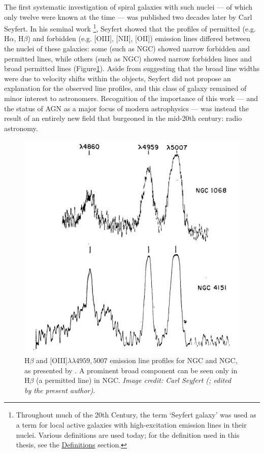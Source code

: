 The first systematic investigation of spiral galaxies with such nuclei --- of which only twelve were known at the time --- was published two decades later by Carl Seyfert. In his seminal work \citep{Seyfert1943}\footnote{Throughout much of the 20th Century, the term `Seyfert galaxy' was used as a term for local active galaxies with high-excitation emission lines in their nuclei. Various definitions are used today; for the definition used in this thesis, see the \hyperlink{chapter: definitions}{Definitions} section.}, Seyfert showed that the profiles of permitted (e.g. H$\alpha$, H$\beta$) and forbidden (e.g. [OIII], [NII], [OII]) emission lines differed between the nuclei of these galaxies: some (such as NGC) showed narrow forbidden and permitted lines, while others (such as NGC) showed narrow forbidden lines and broad permitted lines (Figure\;\ref{fig: introduction: historical_context: seyfert1943_spectra}). Aside from suggesting that the broad line widths were due to velocity shifts within the objects, Seyfert did not propose an explanation for the observed line profiles, and this class of galaxy remained of minor interest to astronomers. Recognition of the importance of this work --- and the status of AGN as a major focus of modern astrophysics --- was instead the result of an entirely new field that burgeoned in the mid-20th century: radio astronomy.

\begin{figure}
    \centering
    \includegraphics{figures/introduction/seyfert1943_spectra.png}
    \caption[Emission-line profiles for NGC and NGC as presented by \citet{Seyfert1943}.]{H$\beta$ and [OIII]$\lambda\lambda4959,5007$ emission line profiles for NGC and NGC, as presented by \citet{Seyfert1943}. A prominent broad component can be seen only in H$\beta$ (a permitted line) in NGC. \textit{Image credit: Carl Seyfert (\citealt{Seyfert1943}; edited by the present author)}.}
    \label{fig: introduction: historical_context: seyfert1943_spectra}
\end{figure}

